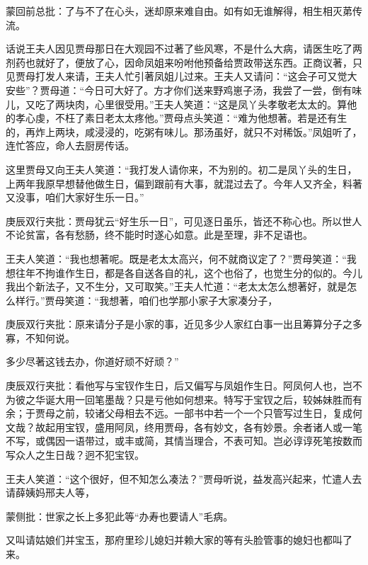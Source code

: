 \begin{parag}
    \begin{note}蒙回前总批：了与不了在心头，迷却原来难自由。如有如无谁解得，相生相灭苐传流。\end{note}
\end{parag}


\begin{parag}
    话说王夫人因见贾母那日在大观园不过著了些风寒，不是什么大病，请医生吃了两剂药也就好了，便放了心，因命凤姐来吩咐他预备给贾政带送东西。正商议著，只见贾母打发人来请，王夫人忙引著凤姐儿过来。王夫人又请问：“这会子可又觉大安些”？贾母道：“今日可大好了。方才你们送来野鸡崽子汤，我尝了一尝，倒有味儿，又吃了两块肉，心里很受用。”王夫人笑道：“这是凤丫头孝敬老太太的。算他的孝心虔，不枉了素日老太太疼他。”贾母点头笑道：“难为他想著。若是还有生的，再炸上两块，咸浸浸的，吃粥有味儿。那汤虽好，就只不对稀饭。”凤姐听了，连忙答应，命人去厨房传话。
\end{parag}


\begin{parag}
    这里贾母又向王夫人笑道：“我打发人请你来，不为别的。初二是凤丫头的生日，上两年我原早想替他做生日，偏到跟前有大事，就混过去了。今年人又齐全，料著又没事，咱们大家好生乐一日。”\begin{note}庚辰双行夹批：贾母犹云“好生乐一日”，可见逐日虽乐，皆还不称心也。所以世人不论贫富，各有愁肠，终不能时时遂心如意。此是至理，非不足语也。\end{note}王夫人笑道：“我也想著呢。既是老太太高兴，何不就商议定了？”贾母笑道：“我想往年不拘谁作生日，都是各自送各自的礼，这个也俗了，也觉生分的似的。今儿我出个新法子，又不生分，又可取笑。”王夫人忙道：“老太太怎么想著好，就是怎么样行。”贾母笑道：“我想著，咱们也学那小家子大家凑分子，\begin{note}庚辰双行夹批：原来请分子是小家的事，近见多少人家红白事一出且筹算分子之多寡，不知何说。\end{note}多少尽著这钱去办，你道好顽不好顽？”\begin{note}庚辰双行夹批：看他写与宝钗作生日，后又偏写与凤姐作生日。阿凤何人也，岂不为彼之华诞大用一回笔墨哉？只是亏他如何想来。特写于宝钗之后，较姊妹胜而有余；于贾母之前，较诸父母相去不远。一部书中若一个一个只管写过生日，复成何文哉？故起用宝钗，盛用阿凤，终用贾母，各有妙文，各有妙景。余者诸人或一笔不写，或偶因一语带过，或丰或简，其情当理合，不表可知。岂必谆谆死笔按数而写众人之生日哉？迥不犯宝钗。\end{note}王夫人笑道：“这个很好，但不知怎么凑法？”贾母听说，益发高兴起来，忙遣人去请薛姨妈邢夫人等，\begin{note}蒙侧批：世家之长上多犯此等“办寿也要请人”毛病。\end{note}又叫请姑娘们并宝玉，那府里珍儿媳妇并赖大家的等有头脸管事的媳妇也都叫了来。
\end{parag}


